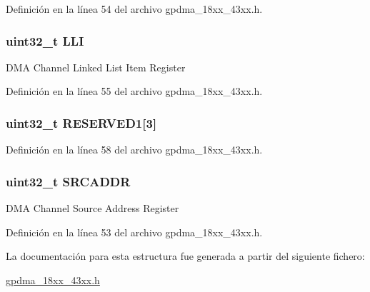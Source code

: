 Definición en la línea 54 del archivo gpdma\+\_\+18xx\+\_\+43xx.\+h.

\subsubsection[{\texorpdfstring{L\+LI}{LLI}}]{ uint32\+\_\+t L\+LI}\hypertarget{struct_g_p_d_m_a___c_h___t_ac4d10dd1744ef7ee8edfaf06d2b6b0f0}{}\label{struct_g_p_d_m_a___c_h___t_ac4d10dd1744ef7ee8edfaf06d2b6b0f0}
D\+MA Channel Linked List Item Register 

Definición en la línea 55 del archivo gpdma\+\_\+18xx\+\_\+43xx.\+h.

\subsubsection[{\texorpdfstring{R\+E\+S\+E\+R\+V\+E\+D1}{RESERVED1}}]{ uint32\+\_\+t R\+E\+S\+E\+R\+V\+E\+D1\mbox{[}3\mbox{]}}\hypertarget{struct_g_p_d_m_a___c_h___t_a96782b173181cab0a32838de81bbe1a6}{}\label{struct_g_p_d_m_a___c_h___t_a96782b173181cab0a32838de81bbe1a6}


Definición en la línea 58 del archivo gpdma\+\_\+18xx\+\_\+43xx.\+h.

\subsubsection[{\texorpdfstring{S\+R\+C\+A\+D\+DR}{SRCADDR}}]{ uint32\+\_\+t S\+R\+C\+A\+D\+DR}\hypertarget{struct_g_p_d_m_a___c_h___t_a4da32b77bf7a0538659a7837c10ceeab}{}\label{struct_g_p_d_m_a___c_h___t_a4da32b77bf7a0538659a7837c10ceeab}
D\+MA Channel Source Address Register 

Definición en la línea 53 del archivo gpdma\+\_\+18xx\+\_\+43xx.\+h.



La documentación para esta estructura fue generada a partir del siguiente fichero\+:\begin{DoxyCompactItemize}
\item 
\hyperlink{gpdma__18xx__43xx_8h}{gpdma\+\_\+18xx\+\_\+43xx.\+h}\end{DoxyCompactItemize}
